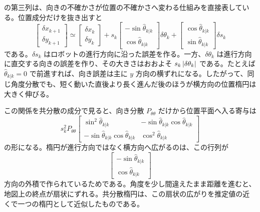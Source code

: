  の第三列は、向きの不確かさが位置の不確かさへ変わる仕組みを直接表している。位置成分だけを抜き出すと
\begin{equation}
  \begin{bmatrix}
    \delta x_{k+1}\\
    \delta y_{k+1}
  \end{bmatrix}
  \simeq
  \begin{bmatrix}
    \delta x_k\\
    \delta y_k
  \end{bmatrix}
  +
  s_k
  \begin{bmatrix}
    -\sin\hat{\theta}_{k|k}\\
     \cos\hat{\theta}_{k|k}
  \end{bmatrix}
  \delta\theta_k
  +
  \begin{bmatrix}
    \cos\hat{\theta}_{k|k}\\
    \sin\hat{\theta}_{k|k}
  \end{bmatrix}
  \delta s_k
\end{equation}
である。$\delta s_k$ はロボットの進行方向に沿った誤差を作る。一方、$\delta\theta_k$ は進行方向に直交する向きの誤差を作り、その大きさはおおよそ $s_k\left|\delta\theta_k\right|$ である。たとえば $\hat{\theta}_{k|k}=0$ で前進すれば、向き誤差は主に $y$ 方向の横ずれになる。したがって、同じ角度分散でも、短く動いた直後より長く進んだ後のほうが横方向の位置楕円は大きく伸びる。

この関係を共分散の成分で見ると、向き分散 $P_{\theta\theta}$ だけから位置平面へ入る寄与は
\begin{equation}
  s_k^2P_{\theta\theta}
  \begin{bmatrix}
    \sin^2\hat{\theta}_{k|k}&-\sin\hat{\theta}_{k|k}\cos\hat{\theta}_{k|k}\\
    -\sin\hat{\theta}_{k|k}\cos\hat{\theta}_{k|k}&\cos^2\hat{\theta}_{k|k}
  \end{bmatrix}
\end{equation}
の形になる。楕円が進行方向ではなく横方向へ広がるのは、この行列が
\begin{equation}
  \begin{bmatrix}
    -\sin\hat{\theta}_{k|k}\\
     \cos\hat{\theta}_{k|k}
  \end{bmatrix}
\end{equation}
方向の外積で作られているためである。角度を少し間違えたまま距離を進むと、地図上の終点が扇状にずれる。共分散楕円は、この扇状の広がりを推定値の近くで一つの楕円として近似したものである。

